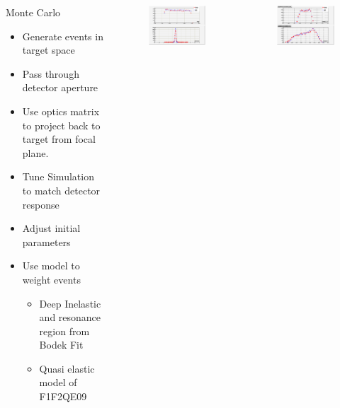 \documentclass{beamer}
\begin{document}
\begin{frame}{}
\begin{columns}
	\begin{block}{Monte Carlo}
		\begin{itemize}
			\item Generate events in target space
			\item Pass through detector aperture
			\item Use optics matrix to project back to target from focal plane.
			\item Tune Simulation to match detector response
			\item Adjust initial parameters
			\item Use model to weight events
			\begin{itemize}
				\item Deep Inelastic and resonance region from Bodek Fit 
				\item Quasi elastic model of F1F2QE09 
			\end{itemize}    
		\end{itemize}
	\end{block}
	\vspace{-20pt}
	\begin{figure}
		\includegraphics[width=6cm]{../images/dp_ytar_1207.png}
	\end{figure}
	\vspace{-30pt}
	\begin{figure}
		\includegraphics[width=6cm]{../images/xp_yp_foc_1207.png}
	\end{figure}
\end{columns}
\end{frame}
\end{document}
